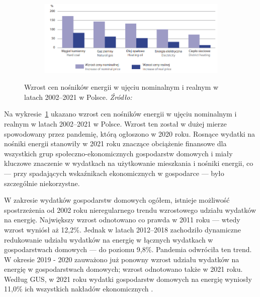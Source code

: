 \documentclass[polish, twoside, 12pt, a4paper]{article}
\theoremstyle{definition}
\theoremstyle{plain}
\theoremstyle{remark}
\begin{document}
\begin{figure}[hbt]
  \centering

  \begin{subfigure}[t]{0.45\textwidth}
    \hspace{-1.7cm}
    \includegraphics[width=1.43\textwidth]{./out_figures/figure_10}
  \end{subfigure}

  \captionsetup{margin=10pt,font=small,labelfont=bf,width=.8\textwidth}

  \caption[Wzrost cen nośników energii w ujęciu nominalnym i realnym w latach 2002--2021 w Polsce.]{Wzrost cen nośników energii w ujęciu nominalnym i realnym w latach 2002--2021 w Polsce. \textit{Źródło:} \cite{gus2023}}\label{fig:x10}
\end{figure}

Na wykresie~\ref{fig:x10} ukazano wzrost cen nośników energii w ujęciu nominalnym i realnym w latach 2002--2021 w Polsce. Wzrost ten został w dużej mierze spowodowany przez pandemię, którą ogłoszono w 2020 roku. Rosnące wydatki na nośniki energii stanowiły w 2021 roku znaczące obciążenie finansowe dla wszystkich grup społeczno-ekonomicznych gospodarstw domowych i miały kluczowe znaczenie w wydatkach na użytkowanie mieszkania i nośniki energii, co --- przy spadających wskaźnikach ekonomicznych w gospodarce --- było szczególnie niekorzystne. 

W zakresie wydatków gospodarstw domowych ogółem, istnieje możliwość spostrzeżenia od 2002 roku nieregularnego trendu wzrostowego udziału wydatków na energię. Największy wzrost odnotowano co prawda w 2011 roku --- wtedy wzrost wyniósł aż 12,2\%. Jednak w latach 2012--2018 zachodziło dynamiczne redukowanie udziału wydatków na energię w łącznych wydatkach w gospodarstwach domowych --- do poziomu 9,8\%. Pandemia odwróciła ten trend. W okresie 2019 - 2020 zauważono już ponowny wzrost udziału wydatków na energię w gospodarstwach domowych; wzrost odnotowano także w 2021 roku. Według GUS, w 2021 roku wydatki gospodarstw domowych na energię wyniosły 11,0\% ich wszystkich nakładów ekonomicznych \citep{gus2023}. 
\end{document}
